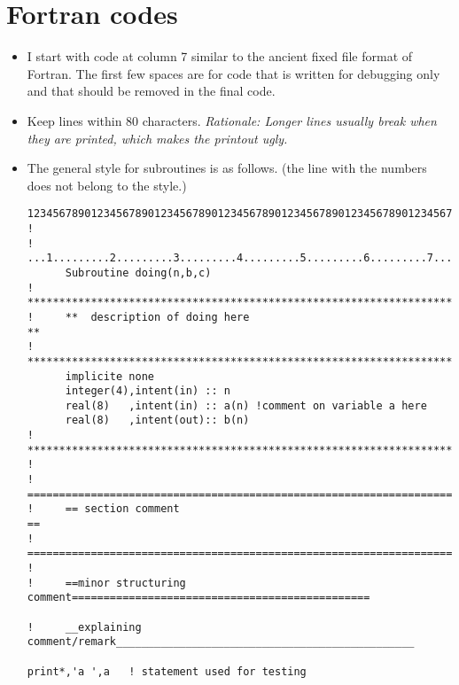 \documentclass[11pt,a4paper]{report}
\begin{document}
\section{Fortran codes}
\begin{itemize}
\item I start with code at column 7 similar to the ancient fixed file
  format of Fortran. The first few spaces are for code that is written
  for debugging only and that should be removed in the final code.
%
\item Keep lines within 80 characters. \textit{Rationale: Longer lines
  usually break when they are printed, which makes the printout ugly.}
%
\item The general style for subroutines is as follows. (the line with
  the numbers does not belong to the style.)
\begin{verbatim}
12345678901234567890123456789012345678901234567890123456789012345678901234567890
!
!     ...1.........2.........3.........4.........5.........6.........7.........8
      Subroutine doing(n,b,c)
!     **************************************************************************
!     **  description of doing here                                           **
!     **************************************************************************
      implicite none
      integer(4),intent(in) :: n
      real(8)   ,intent(in) :: a(n) !comment on variable a here
      real(8)   ,intent(out):: b(n)
!     **************************************************************************
!
!     ==========================================================================
!     == section comment                                                      ==
!     ==========================================================================
!
!     ==minor structuring comment===============================================

!     __explaining comment/remark_______________________________________________

print*,'a ',a   ! statement used for testing 


\end{verbatim}
\end{itemize}
\end{document}

